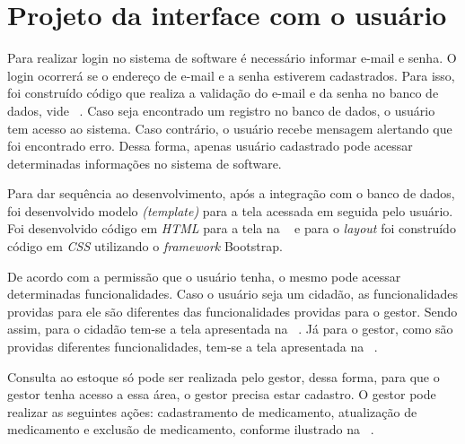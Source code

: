 \section{Projeto da interface com o usuário}

Para realizar login no sistema de software é necessário informar e-mail e senha. O login ocorrerá se o endereço de e-mail e a senha estiverem cadastrados. Para isso, foi construído código que realiza a validação do e-mail e da senha no banco de dados, vide ~. Caso seja encontrado um registro no banco de dados, o usuário tem acesso ao sistema. Caso contrário, o usuário recebe mensagem alertando que foi encontrado erro. Dessa forma, apenas usuário cadastrado pode acessar determinadas informações no sistema de software. 

%

Para dar sequência ao desenvolvimento, após a integração com o banco de dados, foi desenvolvido  modelo \emph{(template)} para a tela acessada em seguida pelo usuário. Foi desenvolvido código em \emph{\acrfull{HTML}} para a tela na ~ e para o \emph{layout} foi construído código em \emph{\acrfull{CSS}} utilizando o \emph{framework} Bootstrap. 


%

%

%

De acordo com a permissão que o usuário tenha, o mesmo pode acessar determinadas funcionalidades. Caso o usuário seja um cidadão, as funcionalidades providas para ele são diferentes das funcionalidades providas para o gestor. Sendo assim, para o cidadão tem-se a tela apresentada na ~. Já para o gestor, como são providas diferentes funcionalidades, tem-se a tela apresentada na ~.

%

Consulta ao estoque só pode ser realizada pelo gestor, dessa forma, para que o gestor tenha acesso a essa área, o gestor precisa estar cadastro. O gestor pode realizar as seguintes ações: cadastramento de medicamento, atualização de medicamento e exclusão de medicamento, conforme ilustrado na ~.


